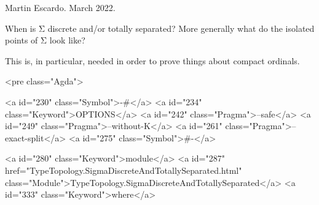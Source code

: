 Martin Escardo. March 2022.

When is Σ discrete and/or totally separated? More generally what do
the isolated points of Σ look like?

This is, in particular, needed in order to prove things about compact
ordinals.

<pre class="Agda">

<a id="230" class="Symbol">{-#</a> <a id="234" class="Keyword">OPTIONS</a> <a id="242" class="Pragma">--safe</a> <a id="249" class="Pragma">--without-K</a> <a id="261" class="Pragma">--exact-split</a> <a id="275" class="Symbol">#-}</a>

<a id="280" class="Keyword">module</a> <a id="287" href="TypeTopology.SigmaDiscreteAndTotallySeparated.html" class="Module">TypeTopology.SigmaDiscreteAndTotallySeparated</a> <a id="333" class="Keyword">where</a>

